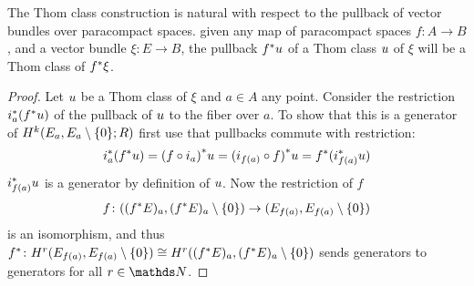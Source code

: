 \begin{Cor}\label{cor:thomclsnatural}
  The Thom class construction is natural with respect to the pullback
  of vector bundles over paracompact spaces.
  \Idest given any map of paracompact spaces $f\colon A\to B$, and a
  vector bundle $\xi\colon E\to B$,
  the pullback ${f}^* u$ of a Thom class $u$ of $\xi$ will
  be a Thom class of ${f}^* \xi$.
  \begin{proof}
    Let $u$ be a Thom class of $\xi$ and $a\in A$ any point.
    Consider the restriction ${i}^*_a({f}^* u)$
    of the pullback of $u$ to the fiber over $a$. To show that this
    is a generator of $H^{k}(E_a, {E_a}\setminus\{0\};R)$ first use that
    pullbacks commute with restriction:
    \begin{gather*}
      {i}^*_a({f}^* u)
      = {(f\circ i_a)}^* u
      = {(i_{f(a)}\circ f)}^* u
      = {f}^* ({i}^*_{f(a)} u)
    \end{gather*}
    ${i}^*_{f(a)} u$ is a generator by definition of $u$.
    Now the restriction of $f$
    \begin{gather*}
      f\colon (({f}^* E)_a, {({f}^* E)_a}\setminus\{0\}) \to (E_{f(a)}, {E_{f(a)}}\setminus\{0\})
    \end{gather*}
    is an isomorphism, and thus
    ${f}^*\colon H^r(E_{f(a)}, {E_{f(a)}}\setminus\{0\})
    \cong H^r(({f}^* E)_a, {({f}^* E)_a}\setminus\{0\})$
    sends generators to generators for all $r\in\Nat$.
  \end{proof}
\end{Cor}


